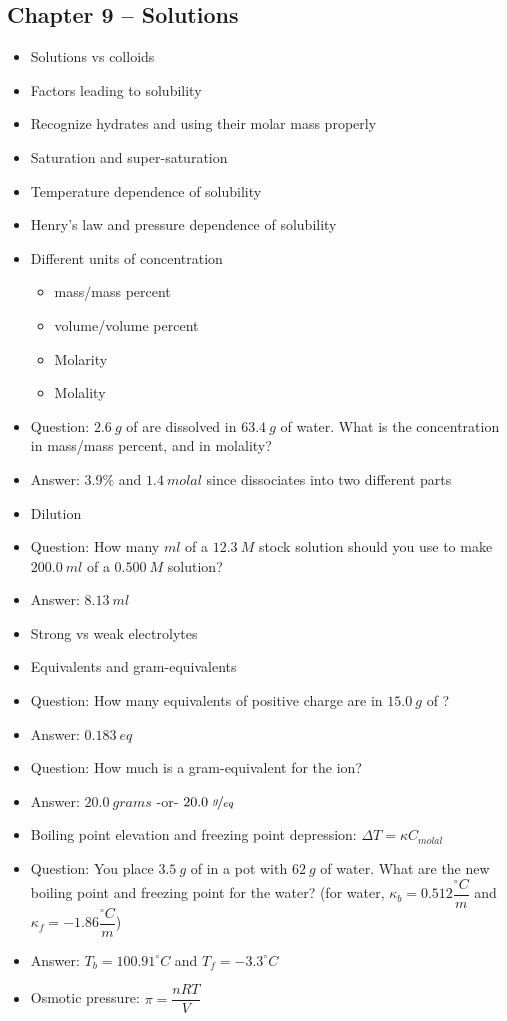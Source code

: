 \documentclass[12pt, letterpaper]{memoir}
\begin{document}
	\subsection*{Chapter 9 --  Solutions}
	\begin{itemize}
		\item Solutions vs colloids
		\item Factors leading to solubility
		\item Recognize hydrates and using their molar mass properly
		\item Saturation and super-saturation
		\item Temperature dependence of solubility
		\item Henry's law and pressure dependence of solubility
		\item Different units of concentration
		\begin{itemize}
			\item mass/mass percent
			\item volume/volume percent
			\item Molarity
			\item Molality
		\end{itemize}
		\item Question: $2.6~g$ of  are dissolved in $63.4~g$ of water. What is the concentration in mass/mass percent, and in molality?
		\item Answer: $3.9\%$ and $1.4~molal$ since  dissociates into two different parts
		\item Dilution
		\item Question: How many $ml$ of a $12.3~M$ stock solution should you use to make $200.0~ml$ of a $0.500~M$ solution?
		\item Answer: $8.13~ml$
		\item Strong vs weak electrolytes
		\item Equivalents and gram-equivalents
		\item Question: How many equivalents of positive charge are in $15.0~g$ of ?
		\item Answer: $0.183~eq$
		\item Question: How much is a gram-equivalent for the  ion?
    \item Answer: $20.0~grams$ -or- $20.0~\nicefrac{g}{eq}$
		\item Boiling point elevation and freezing point depression: $\Delta T=\kappa C_{molal}$
		\item Question: You place $3.5~g$ of  in a pot with $62~g$ of water. What are the new boiling point and freezing point for the water? (for water, $\kappa_b = 0.512\dfrac{^\circ C}{m}$ and $\kappa_f = -1.86\dfrac{^\circ C}{m}$)
		\item Answer: $T_b = 100.91 ^\circ C$ and $T_f = -3.3 ^\circ C$
		\item Osmotic pressure: $\pi = \dfrac{nRT}{V}$
	\end{itemize}
\end{document}
